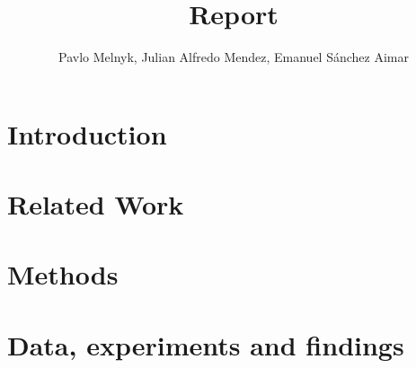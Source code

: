 \documentclass[12pt]{article}
\title{Report}
\author{
    Pavlo Melnyk,
    Julian Alfredo Mendez,
    Emanuel S\'{a}nchez Aimar
}
\newcommand{\contentdescription}[1]{}
\begin{document}
    \maketitle

    \begin{abstract}
        \contentdescription{
            Abstract (5-10\%) :
            Give an overview of what you have done in the project with the key results and findings of your work.
            Should be no more than 300 words.
        }

    \end{abstract}


    \section{Introduction}

    \contentdescription{
        Introduction (5-15\%):
        Describe the problem, the approach of the paper, the experiments, and the results.
        At the high-level talk about what you worked on in your project and why it is important.
        Then give an overview of your results.
    }


    \section{Related Work}
    \contentdescription{
        Related Work (5-15\%): Discuss the published work related to your project paper, the types of experiments you do and the additional method that you have added to this work or you have compared this paper with (if any).
    }


    \section{Methods}
    \contentdescription{
        Methods (15-25\%): Describe the original paper's method to the extent that you would need to make your report and findings understandable. Otherwise, here you can describe other methods that you compare with or other methods that you apply on top of what you reimplemented. Here, you also try to justify any methodical modification or incremental changes that you have added to the original paper. It may be helpful to include figures, diagrams, or tables to describe your method or compare it with other methods.
    }


    \section{Data, experiments and findings}
    \contentdescription{
        Data, experiments and findings (30-40\%):

        Describe the data you are working with for your project. What type of data is it? Where did it come from? How much data are you working with? Did you have to do any preprocessing, filtering, or other special treatment to use this data in your project?
        Describe and present the experiments that you performed and what is the reason for those experiments. Where applicable define evaluation metrics that you used. Discuss the results that you got.
    }
\end{document}
